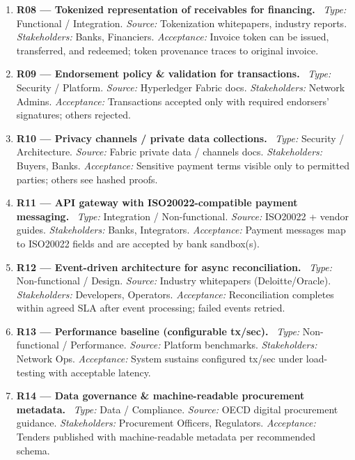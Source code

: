 \documentclass[11pt,a4paper]{article}
\begin{document}
\begin{enumerate}[label=R\arabic*:,leftmargin=*,itemsep=6pt]
\textit{Type:} Functional / Shariah compliance. \textit{Source:} Regulatory + AAOIFI/IFSB guidance. \textit{Stakeholders:} Banks, Shariah Board. \textit{Acceptance:} PLS contract deployable with parameters (profit ratio, loss allocation); ledger records distribution per contract.
\item \textbf{R08 — Tokenized representation of receivables for financing.} \
\textit{Type:} Functional / Integration. \textit{Source:} Tokenization whitepapers, industry reports. \textit{Stakeholders:} Banks, Financiers. \textit{Acceptance:} Invoice token can be issued, transferred, and redeemed; token provenance traces to original invoice.
\item \textbf{R09 — Endorsement policy \& validation for transactions.} \
\textit{Type:} Security / Platform. \textit{Source:} Hyperledger Fabric docs. \textit{Stakeholders:} Network Admins. \textit{Acceptance:} Transactions accepted only with required endorsers' signatures; others rejected.
\item \textbf{R10 — Privacy channels / private data collections.} \
\textit{Type:} Security / Architecture. \textit{Source:} Fabric private data / channels docs. \textit{Stakeholders:} Buyers, Banks. \textit{Acceptance:} Sensitive payment terms visible only to permitted parties; others see hashed proofs.
\item \textbf{R11 — API gateway with ISO20022-compatible payment messaging.} \
\textit{Type:} Integration / Non-functional. \textit{Source:} ISO20022 + vendor guides. \textit{Stakeholders:} Banks, Integrators. \textit{Acceptance:} Payment messages map to ISO20022 fields and are accepted by bank sandbox(s).
\item \textbf{R12 — Event-driven architecture for async reconciliation.} \
\textit{Type:} Non-functional / Design. \textit{Source:} Industry whitepapers (Deloitte/Oracle). \textit{Stakeholders:} Developers, Operators. \textit{Acceptance:} Reconciliation completes within agreed SLA after event processing; failed events retried.
\item \textbf{R13 — Performance baseline (configurable tx/sec).} \
\textit{Type:} Non-functional / Performance. \textit{Source:} Platform benchmarks. \textit{Stakeholders:} Network Ops. \textit{Acceptance:} System sustains configured tx/sec under load-testing with acceptable latency.
\item \textbf{R14 — Data governance \& machine-readable procurement metadata.} \
\textit{Type:} Data / Compliance. \textit{Source:} OECD digital procurement guidance. \textit{Stakeholders:} Procurement Officers, Regulators. \textit{Acceptance:} Tenders published with machine-readable metadata per recommended schema.

\end{enumerate}
\end{document}
